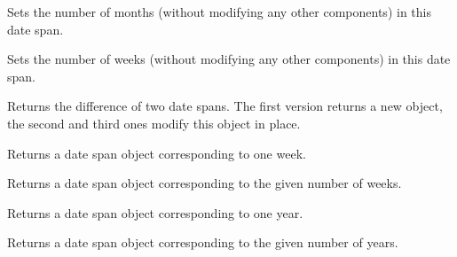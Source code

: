 Sets the number of months (without modifying any other components) in this
date span.



Sets the number of weeks (without modifying any other components) in this date
span.





Returns the difference of two date spans. The first version returns a new
object, the second and third ones modify this object in place.



Returns a date span object corresponding to one week.





Returns a date span object corresponding to the given number of weeks.





Returns a date span object corresponding to one year.





Returns a date span object corresponding to the given number of years.

